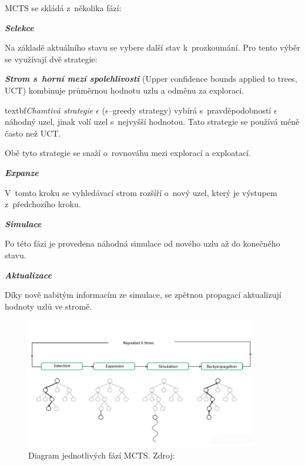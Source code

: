 MCTS se skládá z~několika fází:
\begin{myitemize}
  \item \textbf{\emph{Selekce}}

  Na základě aktuálního stavu se vybere další stav k~prozkoumání.
  Pro tento výběr se využívají dvě strategie:
  
  \textbf{\emph{Strom s~horní mezí spolehlivosti}} (Upper confidence bounds applied to trees, UCT) kombinuje průměrnou hodnotu uzlu a odměnu za exploraci.

  \label{epsilon_greedy}
  textbf{\emph{Chamtivá strategie $\epsilon$ }} ($\epsilon$--greedy strategy) vybírá s~pravděpodobností $\epsilon$ náhodný uzel, jinak volí uzel s~nejvyšší hodnotou.
  Tato strategie se používá méně často než UCT\@.

  Obě tyto strategie se snaží o~rovnováhu mezi explorací a exploatací.
  \item \textbf{\emph{Expanze}}

  V~tomto kroku se vyhledávací strom rozšíří o~nový uzel, který je výstupem z~předchozího kroku.

  \item \textbf{\emph{Simulace}}

  Po této fázi je provedena náhodná simulace od nového uzlu až do konečného stavu.

  \item \textbf{\emph{Aktualizace}}
  
  Díky nově nabitým informacím ze simulace, se zpětnou propagací aktualizují hodnoty uzlů ve stromě.

\end{myitemize}

\begin{figure}[H]
	\centering
	\includegraphics[width=0.9\textwidth]{obrazky-figures/mcts}
	\caption{Diagram jednotlivých fází MCTS.\@
  Zdroj:~\cite{mcts_geeksforgeeks}}\label{fig:mcts}
\end{figure}


